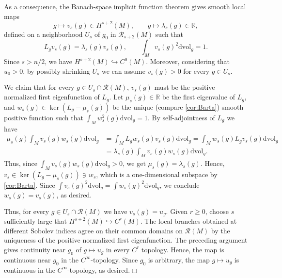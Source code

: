 \documentclass[11pt]{amsart}
\numberwithin{equation}{section}
\newcommand{\R}{\mathbb R}
\newcommand{\Riem}{\mathcal{R}}
\newcommand{\dvol}{\mathrm{dvol}}
\let\geq\geqslant
\begin{document}
As a consequence, the Banach-space implicit function theorem gives smooth local maps 
\[
g\mapsto v_s(g)\in H^{s+2}(M), \qquad g\mapsto\lambda_s(g)\in\mathbb R,
\]
defined on a neighborhood $U_s$ of $g_0$ in $\Riem_{s+2}(M)$ 
such that 
\[
L_{g}v_s(g)=\lambda_s(g)v_s(g), \qquad \int_M v_s(g)^2\dvol_g=1.
\]
Since $s>n/2$, we have
$H^{s+2}(M)\hookrightarrow C^0(M)$. Moreover, considering that $u_0>0$, by possibly shrinking $U_s$ we can assume $v_s(g)>0$ for every $g\in U_s$.

We claim that for every $g\in U_s\cap \Riem(M)$, $v_s(g)$ must be the positive normalized first eigenfunction of $L_g$.
Let $\mu_s(g)\in\R$ be the first eigenvalue of $L_g$, and $w_s(g)\in \ker(L_{g}-\mu_s(g))$ be the unique (compare \cref{cor:Barta}) smooth positive function such that $\int_M w_s^2(g)\dvol_g=1$.
By self-adjointness of $L_g$ we have 
\[
\begin{aligned}
\mu_s(g) \int_M v_s(g)w_s(g)\dvol_g&= \int_M L_g w_s(g)v_s(g)\dvol_g = \int_M w_s(g)L_gv_s(g)\dvol_g \\
&= \lambda_s(g) \int_M v_s(g)w_s(g)\dvol_g.
\end{aligned}
\]
Thus, since $\int_M v_s(g)w_s(g)\dvol_g>0$, we get $\mu_s(g)=\lambda_s(g)$. Hence, $v_s\in \ker(L_g-\mu_s(g))\ni w_s$, which is a one-dimensional subspace by \cref{cor:Barta}. Since $\int v_s(g)^2\dvol_g=\int w_s(g)^2\dvol_g$, we conclude $w_s(g)=v_s(g)$, as desired.

Thus, for every $g\in U_s\cap\Riem(M)$ we have $v_s(g)=u_g$. Given $r\geq0$, choose $s$ sufficiently large that
$H^{s+2}(M)\hookrightarrow C^r(M)$. The local branches obtained at different
Sobolev indices agree on their common domains on $\Riem(M)$ by the uniqueness of the positive
normalized first eigenfunction. The preceding argument gives
continuity near $g_0$ of $g\mapsto u_g$ in every $C^r$ topology. Hence, the map is continuous near $g_0$ in the $C^\infty$-topology. Since $g_0$ is arbitrary, the map $g\mapsto u_g$ is continuous in the $C^\infty$-topology, as desired.\hfill$\Box$



\printbibliography
\end{document}
